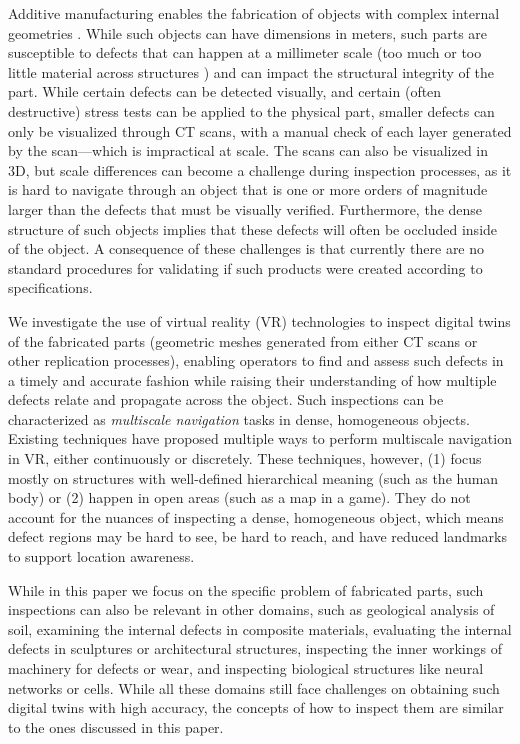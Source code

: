 Additive manufacturing enables the fabrication of objects with complex internal geometries \cite{chheang_virtual_2024}. While such objects can have dimensions in meters, such parts are susceptible to defects that can happen at a millimeter scale (too much or too little material across structures \cite{klacansky_virtual_2022}) and can impact the structural integrity of the part. While certain defects can be detected visually, and certain (often destructive) stress tests can be applied to the physical part, smaller defects can only be visualized through CT scans, with a manual check of each layer generated by the scan---which is impractical at scale. The scans can also be visualized in 3D, but scale differences can become a challenge during inspection processes, as it is hard to navigate through an object that is one or more orders of magnitude larger than the defects that must be visually verified. Furthermore, the dense structure of such objects implies that these defects will often be occluded inside of the object. A consequence of these challenges is that currently there are no standard procedures for validating if such products were created according to specifications. 

We investigate the use of virtual reality (VR) technologies to inspect digital twins of the fabricated parts (geometric meshes generated from either CT scans or other replication processes), enabling operators to find and assess such defects in a timely and accurate fashion while raising their understanding of how multiple defects relate and propagate across the object. Such inspections can be characterized as \textit{multiscale navigation} tasks in dense, homogeneous objects. Existing techniques have proposed multiple ways to perform multiscale navigation in VR, either continuously or discretely. These techniques, however, (1) focus mostly on structures with well-defined hierarchical meaning (such as the human body) or (2) happen in open areas (such as a map in a game). They do not account for the nuances of inspecting a dense, homogeneous object, which means defect regions may be hard to see, be hard to reach, and have reduced landmarks to support location awareness.

While in this paper we focus on the specific problem of fabricated parts, such inspections can also be relevant in other domains, such as geological analysis of soil, examining the internal defects in composite materials, evaluating the internal defects in sculptures or architectural structures, inspecting the inner workings of machinery for defects or wear, and inspecting biological structures like neural networks or cells. While all these domains still face challenges on obtaining such digital twins with high accuracy, the concepts of how to inspect them are similar to the ones discussed in this paper.

